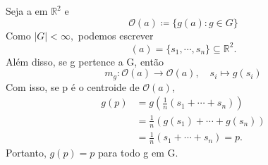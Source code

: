 \documentclass[Algebra/algebra_notes.tex]{subfiles}
\begin{document}
\begin{proof*}
	Seja a em \(\mathbb{R}^{2}\) e
	\[
		\mathcal{O}(a)\coloneqq \{g(a):g\in G\}
	\]
	Como \(|G| < \infty,\) podemos escrever
	\[
		\mathcal{}(a) = \{s_{1},\cdots, s_{n}\}\subseteq{\mathbb{R}^{2}}.
	\]
	Além disso, se g pertence a G, então
	\[
		m_{g}:\mathcal{O}(a)\rightarrow \mathcal{O}(a), \quad s_{i}\mapsto g(s_{i})
	\]
	Com isso, se p é o centroide de \(\mathcal{O}(a)\),
	\begin{align*}
		g(p) & = g(\frac{1}{n}(s_{1}+\cdots+s_{n}))    \\
		     & = \frac{1}{n}(g(s_{1})+\cdots+g(s_{n})) \\
		     & = \frac{1}{n}(s_{1}+\cdots+s_{n}) = p.
	\end{align*}
	Portanto, \(g(p)=p\) para todo g em G. \qedsymbol
\end{proof*}
\end{document}
